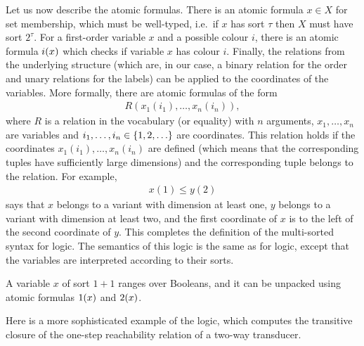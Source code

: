 Let us now describe the atomic formulas. There is an atomic formula $x \in X$ for set membership, which must be well-typed, i.e.~if $x$ has sort $\tau$ then  $X$ must have sort $2^\tau$.  For a first-order variable $x$ and a possible colour $i$, there is an atomic formula 
$
i(x)
$
which checks if variable $x$ has colour $i$.  Finally,  the relations from the underlying structure (which are, in our case, a binary relation for the order and unary relations for the labels) can be applied to the coordinates of the variables.  More formally, there are atomic formulas of the form 
\begin{align*}
R(x_1(i_1),\ldots,x_n(i_n)),
\end{align*}
where $R$ is a relation in the vocabulary (or equality) with $n$ arguments, $x_1,\ldots,x_n$ are variables and $i_1,\ldots,i_n \in \{1,2,\ldots\}$ are coordinates. This relation holds if  the coordinates $x_1(i_1),\ldots,x_n(i_n)$ are defined (which means that the corresponding tuples have sufficiently large dimensions) and the corresponding tuple belongs to the relation.  For example,
\begin{align*}
x(1) \leq  y(2)
\end{align*}
says that $x$ belongs to a variant with dimension at least one, $y$ belongs to a variant with dimension at least two, and the first coordinate of $x$ is to the left of the second coordinate of $y$. This completes the definition of the multi-sorted syntax for \mso logic.  The semantics of this logic is the same as for \mso logic, except that the variables are interpreted according to their sorts.


\begin{myexample}
    A variable $x$ of sort $1+1$ ranges over Booleans, and it can be unpacked using atomic formulas $1(x)$ and $2(x)$.
\end{myexample}

Here is a more sophisticated example of the logic, which computes the transitive closure of the one-step reachability relation of a two-way transducer. 

